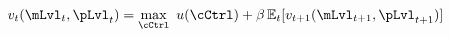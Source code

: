   \begin{equation}\begin{gathered}\begin{aligned}
        \vFunc_{\prd}(\mLvl_{\prd},\pLvl_{\prd})  & = \max_{\cCtrl}~ \uFunc(\cCtrl) + \DiscFac \Ex_{\prd}[ \vFunc_{\prd+1}({\mLvl}_{\prd+1},\pLvl_{\prd+1})]\label{eq:vrecurse}
      \end{aligned}\end{gathered}\end{equation}
